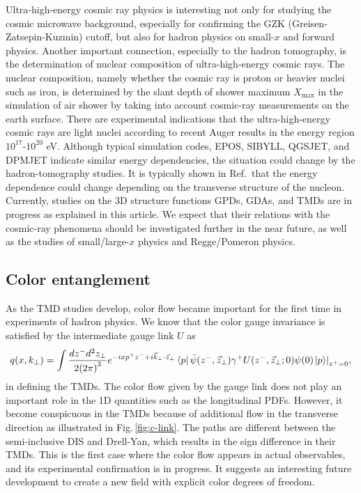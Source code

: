 \documentclass{PoS}
\begin{document}
Ultra-high-energy cosmic ray physics is interesting not only
for studying the cosmic microwave background, especially for
confirming the GZK (Greisen-Zatsepin-Kuzmin) cutoff,
but also for hadron physics on small-$x$ and forward physics.
Another important connection, especially to the hadron tomography, is 
the determination of nuclear composition of ultra-high-energy 
cosmic rays. The nuclear composition, namely whether the cosmic
ray is proton or heavier nuclei such as iron, is determined
by the slant depth of shower maximum $X_{\text{max}}$
in the simulation of air shower by taking into account
cosmic-ray measurements on the earth surface. There are experimental 
indications that the ultra-high-energy cosmic rays are 
light nuclei according to recent Auger results
in the energy region $10^{17}$-$10^{20}$ eV.
Although typical simulation codes, EPOS, SIBYLL, QGSJET, and DPMJET
indicate similar energy dependencies, the situation could change
by the hadron-tomography studies. It is typically shown
in Ref.\,\cite{pk-2010} that the energy dependence could change
depending on the transverse structure of the nucleon.
Currently, studies on the 3D structure functions GPDs, GDAs, and TMDs
are in progress as explained in this article. We expect that
their relations with the cosmic-ray phenomena should be investigated
further in the near future, as well as the studies of
small/large-$x$ physics and Regge/Pomeron physics.

\subsection{Color entanglement}
\label{entanglement}

As the TMD studies develop, color flow became important
for the first time in experiments of hadron physics. We know that the color
gauge invariance is satisfied by the intermediate gauge link
$U$ as
\begin{align}
q(x,{\rm{ }}{k_ \bot }) = 
\int {\frac{{d{z^ - }{d^2}{z_ \bot }}}{{2{{(2\pi )}^3}}}{\rm{ }}} 
{e^{ - ix{p^ + }{z^ - } + i{{\vec k}_ \bot } 
\cdot {{\vec z}_ \bot }}}
\left\langle p \right|\bar \psi ({z^ - },{\rm{ }}{\vec z_ \bot })
{\rm{ }}{\gamma ^ + }U({z^ - },{\rm{  }}{\vec z_ \bot };{\rm{ }}0)
\psi (0){\left. {\left| p \right\rangle } \right|_{{z^ + } = 0}} ,
\nonumber
\label{eqn:gauge-color}
\end{align} 
in defining the TMDs.
The color flow given by the gauge link does not play an important
role in the 1D quantities such as the longitudinal PDFs.
However, it become conspicuous in the TMDs because of additional
flow in the transverse direction as illustrated in 
Fig.\,\ref{fig:c-link}. The paths are different between
the semi-inclusive DIS and Drell-Yan, which results in
the sign difference in their TMDs.
This is the first case where the color flow appears in actual
observables, and its experimental confirmation is in progress.
It suggests an interesting future development to create a new
field with explicit color degrees of freedom.
\end{document}
